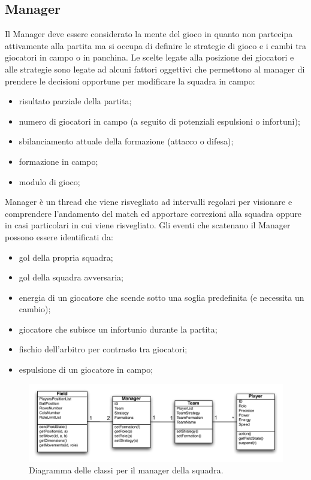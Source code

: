 \documentclass[aps,letterpaper,10pt]{article}
\begin{document}
\subsection{Manager}
\label{manager}

Il Manager deve essere considerato la mente del gioco in quanto non partecipa attivamente alla partita ma si occupa di definire le strategie di gioco e i cambi tra giocatori in campo o in panchina. Le scelte legate alla posizione dei giocatori e alle strategie sono legate ad alcuni fattori oggettivi che permettono al manager di prendere le decisioni opportune per modificare la squadra in campo:

\begin{itemize}
	\item risultato parziale della partita;
	\item numero di giocatori in campo (a seguito di potenziali espulsioni o infortuni);
	\item sbilanciamento attuale della formazione (attacco o difesa);
	\item formazione in campo;
	\item modulo di gioco;
\end{itemize}

Manager \`e un thread che viene risvegliato ad intervalli regolari per visionare e comprendere l'andamento del match ed apportare correzioni alla squadra oppure in casi particolari in cui viene risvegliato. Gli eventi che scatenano il Manager possono essere identificati da:

\begin{itemize}
	\item gol della propria squadra;
	\item gol della squadra avversaria;
	\item energia di un giocatore che scende sotto una soglia predefinita (e necessita un cambio);
	\item giocatore che subisce un infortunio durante la partita;
	\item fischio dell'arbitro per contrasto tra giocatori;
	\item espulsione di un giocatore in campo;
\end{itemize}

\begin{figure}[H]
	\begin{center}
		\includegraphics[width=440px]{images/manager-class.pdf}
	\end{center}
\caption{Diagramma delle classi per il manager della squadra.}
\end{figure}
\end{document}
